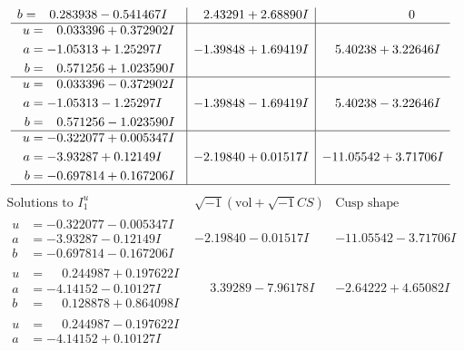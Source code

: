 \documentclass[1p]{elsarticle_modified}
\theoremstyle{definition}
\newcommand{\I}{\sqrt{-1}}
\begin{document}
$$\begin{array}{c|c|c}
\begin{aligned}
b &= \phantom{-}0.283938 - 0.541467 I\end{aligned}
 & \phantom{-}2.43291 + 2.68890 I & \phantom{-0.000000 } 0 \\ \hline\begin{aligned}
u &= \phantom{-}0.033396 + 0.372902 I \\
a &= -1.05313 + 1.25297 I \\
b &= \phantom{-}0.571256 + 1.023590 I\end{aligned}
 & -1.39848 + 1.69419 I & \phantom{-}5.40238 + 3.22646 I \\ \hline\begin{aligned}
u &= \phantom{-}0.033396 - 0.372902 I \\
a &= -1.05313 - 1.25297 I \\
b &= \phantom{-}0.571256 - 1.023590 I\end{aligned}
 & -1.39848 - 1.69419 I & \phantom{-}5.40238 - 3.22646 I \\ \hline\begin{aligned}
u &= -0.322077 + 0.005347 I \\
a &= -3.93287 + 0.12149 I \\
b &= -0.697814 + 0.167206 I\end{aligned}
 & -2.19840 + 0.01517 I & -11.05542 + 3.71706 I\\
 \hline 
 \end{array}$$\newpage$$\begin{array}{c|c|c}  
\text{Solutions to }I^u_{1}& \I (\text{vol} + \sqrt{-1}CS) & \text{Cusp shape}\\
 \hline 
\begin{aligned}
u &= -0.322077 - 0.005347 I \\
a &= -3.93287 - 0.12149 I \\
b &= -0.697814 - 0.167206 I\end{aligned}
 & -2.19840 - 0.01517 I & -11.05542 - 3.71706 I \\ \hline\begin{aligned}
u &= \phantom{-}0.244987 + 0.197622 I \\
a &= -4.14152 - 0.10127 I \\
b &= \phantom{-}0.128878 + 0.864098 I\end{aligned}
 & \phantom{-}3.39289 - 7.96178 I & -2.64222 + 4.65082 I \\ \hline\begin{aligned}
u &= \phantom{-}0.244987 - 0.197622 I \\
a &= -4.14152 + 0.10127 I \\

\end{aligned}
\end{array}$$
\end{document}
